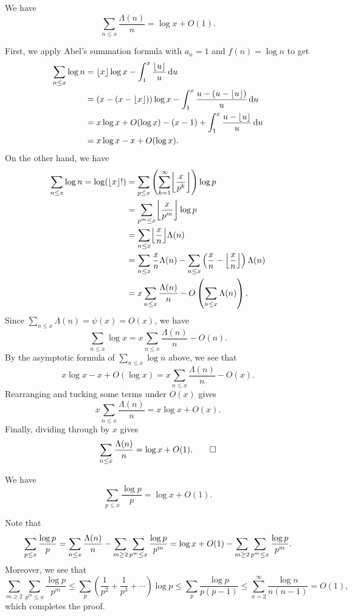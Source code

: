 \begin{thm}
We have 
\[ \sum_{n \leq x} \frac{\Lambda(n)}n = \log x + O(1). \]
\end{thm}
\begin{pf}
First, we apply Abel's summation formula with $a_n = 1$ 
and $f(n) = \log n$ to get 
\begin{align*}
    \sum_{n\leq x} \log n
    &= \lfloor x\rfloor \log x - \int_1^x \frac{\lfloor u\rfloor}u\,\mathrm{d} u \\
    &= (x - (x - \lfloor x\rfloor))\log x - \int_1^x 
    \frac{u - (u - \lfloor u\rfloor)}u \,\mathrm{d} u \\
    &= x\log x + O(\log x) - (x-1) + \int_1^x \frac{u - \lfloor u\rfloor}u\,\mathrm{d} u \\
    &= x\log x - x + O(\log x).
\end{align*}
On the other hand, we have 
\begin{align*}
    \sum_{n\leq x} \log n 
    = \log(\floor{x}!) 
    &= \sum_{p\leq x} \left( \sum_{k=1}^\infty \floor*{\frac{x}{p^k}} \right)\log p \\
    &= \sum_{p^m \leq x} \floor*{\frac{x}{p^m}} \log p \\
    &= \sum_{n \leq x} \floor*{\frac xn} \Lambda(n) \\
    &= \sum_{n \leq x} \frac xn \Lambda(n) - 
    \sum_{n\leq x} \left( \frac xn - \floor*{\frac xn} \right)
    \Lambda(n) \\
    &= x \sum_{n\leq x} \frac{\Lambda(n)}n - O\left( \sum_{n\leq x} \Lambda(n) \right). 
\end{align*}
Since $\sum_{n\leq x} \Lambda(n) = \psi(x) = O(x)$, we have 
\[ \sum_{n\leq x} \log x = x \sum_{n \leq x} \frac{\Lambda(n)}n - O(n). \]
By the asymptotic formula of $\sum_{n\leq x} \log n$ above, we see that 
\[ x\log x - x + O(\log x) = x\sum_{n\leq x} \frac{\Lambda(n)}n - O(x). \]
Rearranging and tucking some terms under $O(x)$ gives 
\[ x \sum_{n\leq x} \frac{\Lambda(n)}n = x\log x + O(x). \]
Finally, dividing through by $x$ gives 
\[ \sum_{n\leq x} \frac{\Lambda(n)}n = \log x + O(1). \qedhere \]
\end{pf}

\begin{thm}
We have
\[ \sum_{p\leq x} \frac{\log p}p = \log x + O(1). \]
\end{thm}
\begin{pf}
Note that 
\[ \sum_{p \leq x} \frac{\log p}p 
= \sum_{n \leq x} \frac{\Lambda(n)}n - \sum_{m\geq2} \sum_{p^m\leq x} \frac{\log p}{p^m} \\
= \log x + O(1) - \sum_{m\geq2}\sum_{p^m\leq x}
\frac{\log p}{p^m}. \]
Moreover, we see that 
\[ \sum_{m\geq2}\sum_{p^m\leq x}
\frac{\log p}{p^m} \leq \sum_p \left( \frac1{p^2} + \frac1{p^3} + \cdots \right)\log p 
\leq \sum_p \frac{\log p}{p(p-1)} 
\leq \sum_{n=2}^\infty \frac{\log n}{n(n-1)} = O(1), \]
which completes the proof.
\end{pf}

